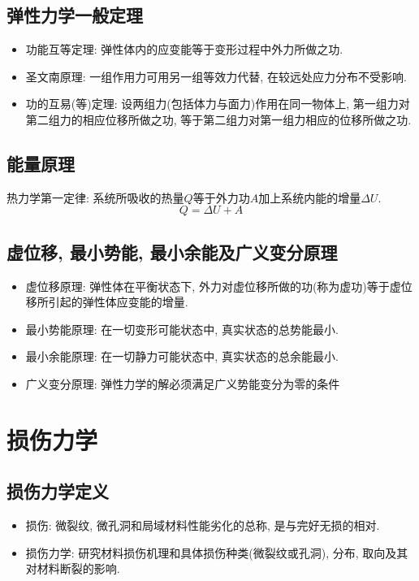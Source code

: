 \documentclass[a4paper,titlepage,twocolumn]{article}
\begin{document}
\subsection{弹性力学一般定理}
\begin{itemize}
\item 功能互等定理: 弹性体内的应变能等于变形过程中外力所做之功.
\item 圣文南原理: 一组作用力可用另一组等效力代替, 在较远处应力分布不受影响.
\item 功的互易(等)定理: 设两组力(包括体力与面力)作用在同一物体上, 第一组力对第二组力的相应位移所做之功, 等于第二组力对第一组力相应的位移所做之功.
\end{itemize}

\subsection{能量原理}
热力学第一定律: 系统所吸收的热量$Q$等于外力功$A$加上系统内能的增量$\Delta U$.
\[
Q=\Delta U + A
\]

\subsection{虚位移, 最小势能, 最小余能及广义变分原理}
\begin{itemize}
\item 虚位移原理: 弹性体在平衡状态下, 外力对虚位移所做的功(称为虚功)等于虚位移所引起的弹性体应变能的增量.
\item 最小势能原理: 在一切变形可能状态中, 真实状态的总势能最小.
\item 最小余能原理: 在一切静力可能状态中, 真实状态的总余能最小.
\item 广义变分原理: 弹性力学的解必须满足广义势能变分为零的条件
\end{itemize}


\section{损伤力学}

\subsection{损伤力学定义}
\begin{itemize}
\item 损伤: 微裂纹, 微孔洞和局域材料性能劣化的总称, 是与完好无损的相对.
\item 损伤力学: 研究材料损伤机理和具体损伤种类(微裂纹或孔洞), 分布, 取向及其对材料断裂的影响.
\end{itemize}
\end{document}
